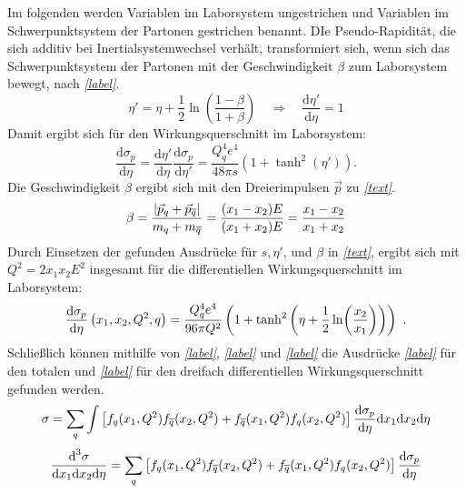 Im folgenden werden Variablen im Laborsystem ungestrichen und Variablen im Schwerpunktsystem der Partonen gestrichen benannt. DIe Pseudo-Rapidität, die sich additiv bei Inertialsystemwechsel verhält, transformiert sich, wenn sich das Schwerpunktsystem der Partonen mit der Geschwindigkeit $\beta$ zum Laborsystem bewegt, nach \textit{\autoref{label}}.
\begin{equation}
\eta' = \eta + \frac{1}{2}\ln(\frac{1-\beta}{1+\beta}) \quad \Rightarrow \quad \frac{\text{d}\eta'}{\text{d}\eta} = 1 
\end{equation}
Damit ergibt sich für den Wirkungsquerschnitt im Laborsystem: 
\begin{equation}
\frac{\text{d}\sigma_p}{\text{d}\eta} = \frac{\text{d}\eta'}{\text{d}\eta} \frac{\text{d}\sigma_p}{\text{d}\eta'} = \frac{Q_q^4e^4}{48\pi s}(1+\tanh^2(\eta')).
\end{equation}
Die Geschwindigkeit $\beta$ ergibt sich mit den Dreierimpulsen $\vec{p}$ zu \textit{\autoref{text}}.
\begin{equation}
\beta = \frac{\abs{\vec{p}_q + \vec{p}_{\overline{q}}}}{m_q + m_{\overline{q}}} = \frac{(x_1 - x_2)E}{(x_1 + x_2)E} = \frac{x_1 - x_2}{x_1 + x_2}
\end{equation}
Durch Einsetzen der gefunden Ausdrücke für $s, \eta'$, und $\beta$ in \textit{\autoref{text}}, ergibt sich mit $Q^2 = 2 x_1 x_2 E^2$ insgesamt für die differentiellen Wirkungsquerschnitt im Laborsystem:
\begin{equation}
\derivative{\sigma_p}{\eta}\left(x_1, x_2, Q^2, q\right) = \frac{Q_q^4e^4}{96\pi Q^2} \left(1+\tanh^2\left(\eta + \frac{1}{2}\ln(\frac{x_2}{x_1})\right)\right)~.
\end{equation}
Schließlich können mithilfe von \textit{\autoref{label}}, \textit{\autoref{label}} und \textit{\autoref{label}} die Ausdrücke \textit{\autoref{label}} für den totalen und \textit{\autoref{label}} für den dreifach differentiellen Wirkungsquerschnitt gefunden werden.
\begin{equation}
\sigma = \sum_{q} \int \left[f_q(x_1, Q^2)f_{\overline{q}}(x_2, Q^2) +f_{\overline{q}}(x_1, Q^2)f_{q}(x_2, Q^2) \right] \derivative{\sigma_p}{\eta} \text{d}x_1\text{d}x_2\text{d}\eta
\end{equation}
\begin{equation}
\frac{\text{d}^3\sigma}{\text{d}x_1\text{d}x_2\text{d}\eta} = \sum_{q} \left[f_q(x_1, Q^2)f_{\overline{q}}(x_2, Q^2) +f_{\overline{q}}(x_1, Q^2)f_{q}(x_2, Q^2) \right] \derivative{\sigma_p}{\eta} 
\end{equation}
